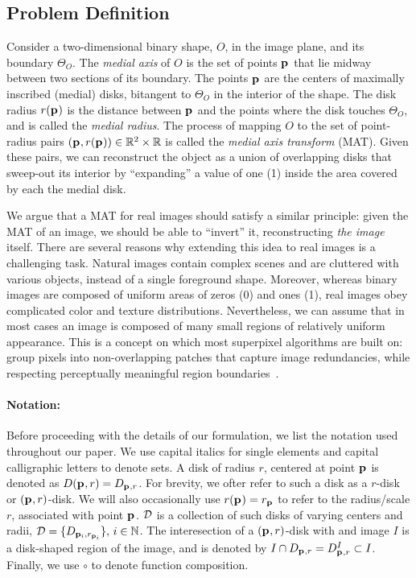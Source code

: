 \documentclass[10pt,twocolumn,letterpaper]{article}
\begin{document}
\subsection{Problem Definition}\label{sec:method:definition}
Consider a two-dimensional binary shape, $O$, in the image plane, and its boundary $\Theta_O$.
The \emph{medial axis} of $O$ is the set of points $\mathbf{p}_{}$ that lie midway between two sections of 
its boundary. The points $\mathbf{p}_{}$ are the centers of maximally inscribed (medial) disks, bitangent to $\Theta_O$
in the interior of the shape. The disk radius $r(\mathbf{p}_{})$ is the distance between $\mathbf{p}_{}$ and 
the points where the disk touches $\Theta_O$, and is called the \emph{medial radius}.
The process of mapping $O$ to the set of point-radius pairs $(\mathbf{p}_{},r(\mathbf{p}_{})) \in \mathbb{R}^2 \times \mathbb{R}$
is called the \emph{medial axis transform} (MAT).
Given these pairs, we can reconstruct the object as a union of overlapping disks that sweep-out 
its interior by ``expanding'' a value of one (1) inside the area covered by each the medial disk.

We argue that a MAT for real images should satisfy a similar principle: given the MAT of an image, 
we should be able to ``invert'' it, reconstructing \emph{the image} itself.
There are several reasons why extending this idea to real images is a challenging task. 
Natural images contain complex scenes and are cluttered with various objects, instead of a single foreground shape.
Moreover, whereas binary images are composed of uniform areas of zeros (0) and ones (1), 
real images obey complicated color and texture distributions.
Nevertheless, we can assume that in most cases an image is composed of many small regions of relatively uniform appearance.
This is a concept on which most superpixel algorithms are built on: group pixels 
into non-overlapping patches that capture image redundancies, while respecting perceptually meaningful region 
boundaries~\cite{shi2000normalized,levinshtein2009turbopixels,achanta2012slic}. 

\paragraph{Notation:} Before proceeding with the details of our formulation, we list the notation used throughout our paper.
We use capital italics for single elements and capital calligraphic letters to denote sets. A disk of radius $r$,
centered at point $\mathbf{p}_{}$ is denoted as $D(\mathbf{p}_{},r)=D_{\mathbf{p}_{},r}$. 
For brevity, we ofter refer to such a disk as a $r$-disk or $(\mathbf{p}_{},r)$-disk.
We will also occasionally use $r(\mathbf{p}_{}) = r_{\mathbf{p}_{}}$ to refer to the radius/scale $r$, associated with point $\mathbf{p}_{}$.
$\mathcal{D}$ is a collection of such disks of varying centers and radii, $\mathcal{D}=\{ D_{\mathbf{p}_{i},r_{\mathbf{p}_{i}}} \},\, i\in\mathbb{N}$.
The interesection of a $(\mathbf{p}_{},r)$-disk with and image $I$ is a disk-shaped region of the image, and is denoted by 
$I \cap D_{\mathbf{p}_{},r}=D_{\mathbf{p}_{},r}^I \subset I$. Finally, we use $\circ$ to denote function composition.
\end{document}
